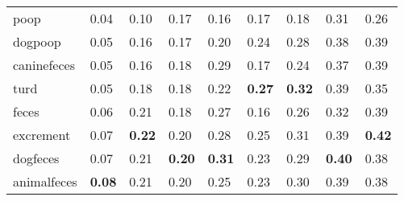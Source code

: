 \begin{table}[t]
\begin{tabular}{lllllllll}
 poop        & 0.04                 & 0.10                  & 0.17                 & 0.16                  & 0.17                 & 0.18                  & 0.31                 & 0.26                  \\
 dogpoop     & 0.05                 & 0.16                  & 0.17                 & 0.20                  & 0.24                 & 0.28                  & 0.38                 & 0.39                  \\
 caninefeces & 0.05                 & 0.16                  & 0.18                 & 0.29                  & 0.17                 & 0.24                  & 0.37                 & 0.39                  \\
 turd        & 0.05                 & 0.18                  & 0.18                 & 0.22                  & \textbf{0.27}        & \textbf{0.32}         & 0.39                 & 0.35                  \\
 feces       & 0.06                 & 0.21                  & 0.18                 & 0.27                  & 0.16                 & 0.26                  & 0.32                 & 0.39                  \\
 excrement   & 0.07                 & \textbf{0.22}         & 0.20                 & 0.28                  & 0.25                 & 0.31                  & 0.39                 & \textbf{0.42}         \\
 dogfeces    & 0.07                 & 0.21                  & \textbf{0.20}        & \textbf{0.31}         & 0.23                 & 0.29                  & \textbf{0.40}        & 0.38                  \\
 animalfeces & \textbf{0.08}        & 0.21                  & 0.20                 & 0.25                  & 0.23                 & 0.30                  & 0.39                 & 0.38                  \\
\bottomrule
\end{tabular}


\end{table}
